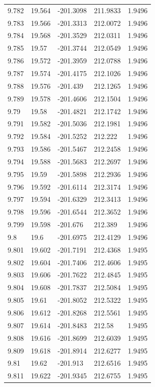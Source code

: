 \begin{tabular}{lllll}
9.782 & 19.564 & -201.3098 & 211.9833 & 1.9496 \\
9.783 & 19.566 & -201.3313 & 212.0072 & 1.9496 \\
9.784 & 19.568 & -201.3529 & 212.0311 & 1.9496 \\
9.785 & 19.57 & -201.3744 & 212.0549 & 1.9496 \\
9.786 & 19.572 & -201.3959 & 212.0788 & 1.9496 \\
9.787 & 19.574 & -201.4175 & 212.1026 & 1.9496 \\
9.788 & 19.576 & -201.439 & 212.1265 & 1.9496 \\
9.789 & 19.578 & -201.4606 & 212.1504 & 1.9496 \\
9.79 & 19.58 & -201.4821 & 212.1742 & 1.9496 \\
9.791 & 19.582 & -201.5036 & 212.1981 & 1.9496 \\
9.792 & 19.584 & -201.5252 & 212.222 & 1.9496 \\
9.793 & 19.586 & -201.5467 & 212.2458 & 1.9496 \\
9.794 & 19.588 & -201.5683 & 212.2697 & 1.9496 \\
9.795 & 19.59 & -201.5898 & 212.2936 & 1.9496 \\
9.796 & 19.592 & -201.6114 & 212.3174 & 1.9496 \\
9.797 & 19.594 & -201.6329 & 212.3413 & 1.9496 \\
9.798 & 19.596 & -201.6544 & 212.3652 & 1.9496 \\
9.799 & 19.598 & -201.676 & 212.389 & 1.9496 \\
9.8 & 19.6 & -201.6975 & 212.4129 & 1.9496 \\
9.801 & 19.602 & -201.7191 & 212.4368 & 1.9495 \\
9.802 & 19.604 & -201.7406 & 212.4606 & 1.9495 \\
9.803 & 19.606 & -201.7622 & 212.4845 & 1.9495 \\
9.804 & 19.608 & -201.7837 & 212.5084 & 1.9495 \\
9.805 & 19.61 & -201.8052 & 212.5322 & 1.9495 \\
9.806 & 19.612 & -201.8268 & 212.5561 & 1.9495 \\
9.807 & 19.614 & -201.8483 & 212.58 & 1.9495 \\
9.808 & 19.616 & -201.8699 & 212.6039 & 1.9495 \\
9.809 & 19.618 & -201.8914 & 212.6277 & 1.9495 \\
9.81 & 19.62 & -201.913 & 212.6516 & 1.9495 \\
9.811 & 19.622 & -201.9345 & 212.6755 & 1.9495 \\

\end{tabular}
